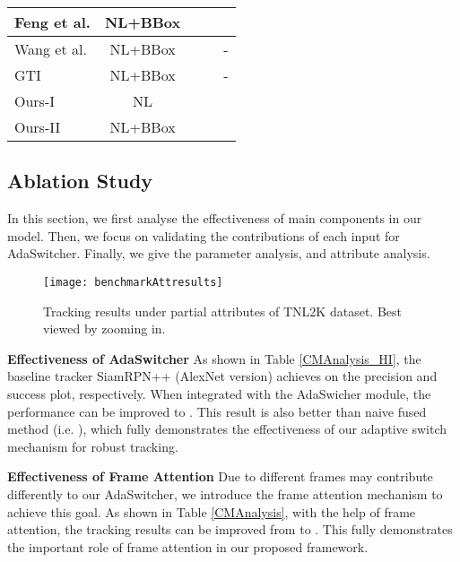 \documentclass[final]{cvpr}
\begin{document}
\begin{table}
\begin{tabular}{l|c|c|c|c}
Feng et al. \cite{feng2020langTrackwacv}		&NL+BBox        	&       		&     		&        			 \\
\hline 
Wang et al. \cite{wang2018describe}		&NL+BBox        	&       		&     		&-        			 \\ 
\hline 
GTI \cite{yang2019grounding} 				&NL+BBox       	&       		&     		&-        			 \\
\hline \toprule [0.8 pt]
Ours-I														&NL        				&       	&     			&       \\				Ours-II														&NL+BBox        	&       &			    &       \\				\hline \toprule [0.8 pt]
\end{tabular}
\end{table}	

  











\subsection{Ablation Study} 

In this section, we first analyse the effectiveness of main components in our model. Then, we focus on validating the contributions of each input for AdaSwitcher. Finally, we give the parameter analysis, and attribute analysis. 


\begin{figure*}[!htb]
\center
\texttt{[image: benchmarkAttresults]}
\caption{	Tracking results under partial attributes of TNL2K dataset. Best viewed by zooming in.  }
\label{benchmarkAttresults}
\end{figure*} 	



\textbf{Effectiveness of AdaSwitcher } 
As shown in Table \ref{CMAnalysis_HI}, the baseline tracker SiamRPN++ \cite{li2018siamrpn++} (AlexNet version) achieves  on the precision and success plot, respectively. When integrated with the AdaSwicher module, the performance can be improved to . This result is also better than naive fused method (i.e. ), which fully demonstrates the effectiveness of our adaptive switch mechanism for robust tracking. 


\textbf{Effectiveness of Frame Attention }
Due to different frames may contribute differently to our AdaSwitcher, we introduce the frame attention mechanism to achieve this goal. As shown in Table \ref{CMAnalysis}, with the help of frame attention, the tracking results can be improved from  to . This fully demonstrates the important role of frame attention in our proposed framework.  
\end{document}
